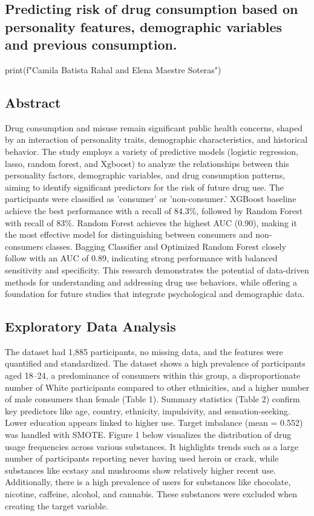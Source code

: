\documentclass{article}
\begin{document}
\begin{center}
\section*{Predicting risk of drug consumption based on personality features, demographic variables and previous consumption.}

\begin{pycode}
print(f"Camila Batista Rahal and Elena Maestre Soteras")
\end{pycode}
\end{center}

\subsection*{Abstract}
Drug consumption and misuse remain significant public health concerns, shaped by an interaction of personality traits, demographic characteristics, and historical behavior. The study employs a variety of predictive models (logistic regression, lasso, random forest, and Xgboost) to analyze the relationships between this personality factors, demographic variables, and drug consumption patterns, aiming to identify significant predictors for the risk of future drug use. The participants were classified as 'consumer' or 'non-consumer.' XGBoost baseline achieve the best performance with a recall of 84.3\%, followed by Random Forest with recall of 83\%. Random Forest achieves the highest AUC (0.90), making it the most effective model for distinguishing between consumers and non-consumers classes. Bagging Classifier and Optimized Random Forest closely follow with an AUC of 0.89, indicating strong performance with balanced sensitivity and specificity. This research demonstrates the potential of data-driven methods for understanding and addressing drug use behaviors, while offering a foundation for future studies that integrate psychological and demographic data.



\subsection*{Exploratory Data Analysis}
The dataset had 1,885 participants, no missing data, and the features were quantified and standardized. The dataset shows a high prevalence of participants aged 18–24, a predominance of consumers within this group, a disproportionate number of White participants compared to other ethnicities, and a higher number of male consumers than female (Table 1). Summary statistics (Table 2) confirm key predictors like age, country, ethnicity, impulsivity, and sensation-seeking. Lower education appears linked to higher use. Target imbalance (mean = 0.552) was handled with SMOTE. Figure 1 below visualizes the distribution of drug usage frequencies across various substances. It highlights trends such as a large number of participants reporting never having used heroin or crack, while substances like ecstasy and mushrooms show relatively higher recent use. Additionally, there is a high prevalence of users for substances like chocolate, nicotine, caffeine, alcohol, and cannabis. These substances were excluded when creating the target variable.
\end{document}
